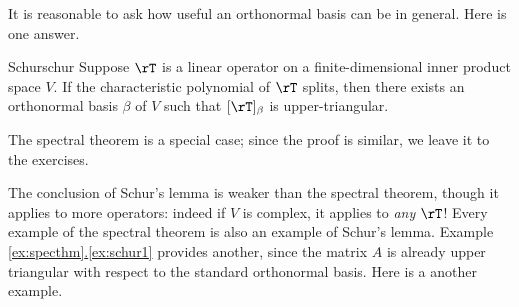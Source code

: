 
It is reasonable to ask how useful an orthonormal basis can be in general. Here is one answer.

% 

\begin{lemm}{Schur}{schur}
Suppose $\rT$ is a linear operator on a finite-dimensional inner product space $V$. If the characteristic polynomial of $\rT$ splits, then there exists an orthonormal basis $\beta$ of $V$ such that $[\rT]_\beta$ is upper-triangular.
\end{lemm}

The spectral theorem is a special case; since the proof is similar, we leave it to the exercises.\smallbreak

The conclusion of Schur's lemma is weaker than the spectral theorem, though it applies to more operators: indeed if $V$ is complex, it applies to \emph{any} $\rT$! Every example of the spectral theorem is also an example of Schur's lemma. Example \hyperref[ex:schur1]{\ref*{ex:specthm}.\ref*{ex:schur1}} provides another, since the matrix $A$ is already upper triangular with respect to the standard orthonormal basis. Here is a another example.

